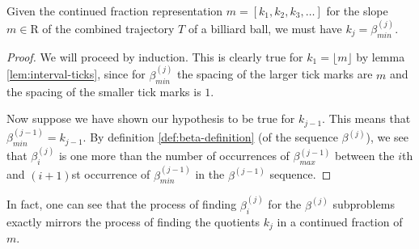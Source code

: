 \begin{theorem}
  Given the continued fraction representation $m = [k_1, k_2, k_3, \ldots]$ for the slope $m \in \mathrm{R}$ of the combined trajectory $T$ of a billiard ball, we must have $k_j = \beta_{min}^{(j)}$.
\end{theorem}
\begin{proof}
  We will proceed by induction. This is clearly true for $k_1 = \lfloor m \rfloor$ by lemma \ref{lem:interval-ticks}, since for $\beta_{min}^{(j)}$ the spacing of the larger tick marks are $m$ and the spacing of the smaller tick marks is $1$.

  Now suppose we have shown our hypothesis to be true for $k_{j-1}$. This means that $\beta_{min}^{(j-1)} = k_{j-1}$. By definition \ref{def:beta-definition} (of the sequence $\beta^{(j)}$), we see that $\beta_i^{(j)}$ is one more than the number of occurrences of $\beta^{(j-1)}_{max}$ between the $i$th and $(i+1)$st occurrence of $\beta^{(j-1)}_{min}$ in the $\beta^{(j-1)}$ sequence.
\end{proof}

In fact, one can see that the process of finding $\beta^{(j)}_i$ for the $\beta^{(j)}$ subproblems exactly mirrors the process of finding the quotients $k_j$ in a continued fraction of $m$.

